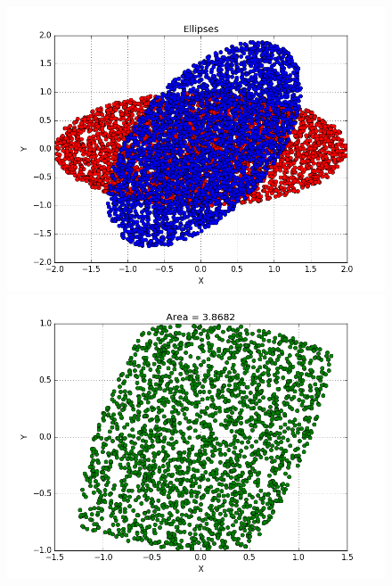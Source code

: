 \documentclass[a4paper]{article}
\begin{document}
\begin{figure}[ht]
\includegraphics[scale=.65]{01.png}
\includegraphics[scale=.65]{02.png}
\end{figure}
\end{document}
